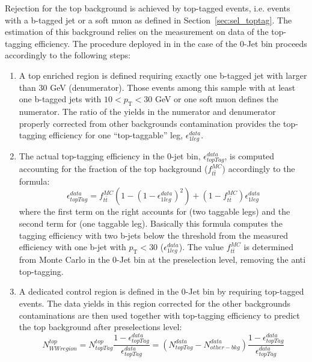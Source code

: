 Rejection for the top background is achieved by top-tagged events, i.e. events with a b-tagged jet
or a soft muon as defined in Section~\ref{sec:sel_toptag}. 
The estimation of this background relies on the measurement on data of the top-tagging efficiency.
The procedure deployed in \cite{HWW2011} in the case of the 0-Jet bin proceeds accordingly to the following steps:
\begin{enumerate}
\item A top enriched region is defined requiring exactly one b-tagged jet with \pt larger than $30$ GeV (denumerator). 
Those events among this sample with at least one b-tagged jets with $10<\ensuremath{p_\mathrm{T}}<30$ GeV 
or one soft muon defines the numerator. The ratio of the yields in the numerator and denumerator properly corrected
from other backgrounds contamination provides the top-tagging efficiency 
for one ``top-taggable'' leg, $\epsilon_{1leg}^{data}$. 
\item The actual top-tagging efficiency in the 0-jet bin, $\epsilon_{topTag}^{data}$, is computed accounting for 
the \ttbar fraction of the top background ($f_{t\bar{t}}^{MC}$) accordingly to the formula:
\begin{equation} \label{eq:oldTopTagEff}
\epsilon_{topTag}^{data} = f_{t\bar{t}}^{MC}(1-(1-\epsilon_{1leg}^{data})^2) + (1-f_{t\bar{t}}^{MC})\epsilon_{1leg}^{data}
\end{equation} 
where the first term on the right accounts for \ttbar (two taggable legs) and the second term for \tw 
(one taggable leg). 
Basically this formula computes the tagging efficiency with two b-jets below the threshold from the 
measured efficiency with one b-jet with $\ensuremath{p_\mathrm{T}}<30$ ($\epsilon_{1leg}^{data}$). 
The value $f_{t\bar{t}}^{MC}$ is determined from Monte Carlo in the 0-Jet bin 
at the \WW preselection level, removing the anti top-tagging.
\item A dedicated control region is defined in the 0-Jet bin by requiring top-tagged events. 
The data yields in this region corrected for the other backgrounds contaminations are then used
together with top-tagging efficiency to predict the top background after \WW preselections level:
\begin{equation} \label{eq:topExtrapolation}
N^{top}_{WW region}=N_{topTag}^{top}\frac{1-\epsilon_{topTag}^{data}}{\epsilon_{topTag}^{data}} = 
(N_{topTag}^{data}-N_{other-bkg}^{data})\frac{1-\epsilon_{topTag}^{data}}{\epsilon_{topTag}^{data}}
\end{equation} 
\end{enumerate} 

